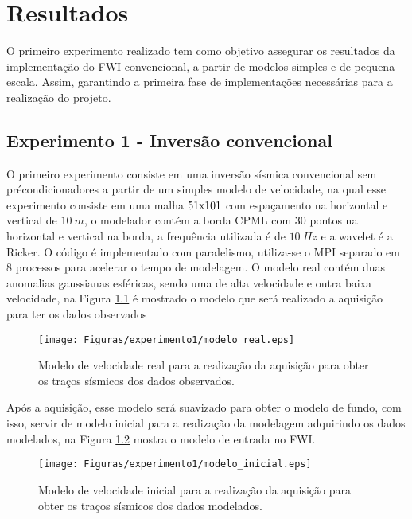 \chapter{Resultados}

O primeiro experimento realizado tem como objetivo assegurar os resultados da implementação do FWI convencional, a partir de modelos simples e de pequena escala. Assim, garantindo a primeira fase de implementações necessárias para a realização do projeto.


\section{Experimento 1 - Inversão convencional}
O primeiro experimento consiste em uma inversão sísmica convencional sem précondicionadores a partir de um simples modelo de velocidade, na qual esse experimento consiste em uma malha $51\hbox{x}101$ com espaçamento na horizontal e vertical de $10~m$, o modelador contém a borda CPML com 30 pontos na horizontal e vertical na borda, a frequência utilizada é de $10~Hz$ e a wavelet é a Ricker. O código é implementado com paralelismo, utiliza-se o MPI separado em 8 processos para acelerar o tempo de modelagem. O modelo real contém duas anomalias gaussianas esféricas, sendo uma de alta velocidade e outra baixa velocidade, na Figura \ref{modeloreal} é mostrado o modelo que será realizado a aquisição para ter os dados observados

\begin{figure}[htb]
\centering
\texttt{[image: Figuras/experimento1/modelo\_real.eps]}
\caption{Modelo de velocidade real para a realização da aquisição para obter os traços sísmicos dos dados observados.}
\label{modeloreal}
\end{figure}


Após a aquisição, esse modelo será suavizado para obter o modelo de fundo, com isso, servir de modelo inicial para a realização da modelagem adquirindo os dados modelados, na Figura \ref{modeloinicial} mostra o modelo de entrada no FWI.

\begin{figure}
\centering
\texttt{[image: Figuras/experimento1/modelo\_inicial.eps]}
\caption{Modelo de velocidade inicial para a realização da aquisição para obter os traços sísmicos dos dados modelados.}
\label{modeloinicial}
\end{figure}

\\

